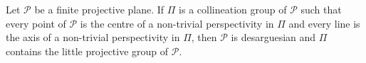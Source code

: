Let $\mathcal{P}$ be a finite projective plane. If $\Pi$ is a collineation group of $\mathcal{P}$ such that every point of $\mathcal{P}$ is the centre of a non-trivial perspectivity in $\Pi$ and every line is the axis of a non-trivial perspectivity in $\Pi$, then $\mathcal{P}$ is desarguesian and $\Pi$ contains the little projective group of $\mathcal{P}$.
